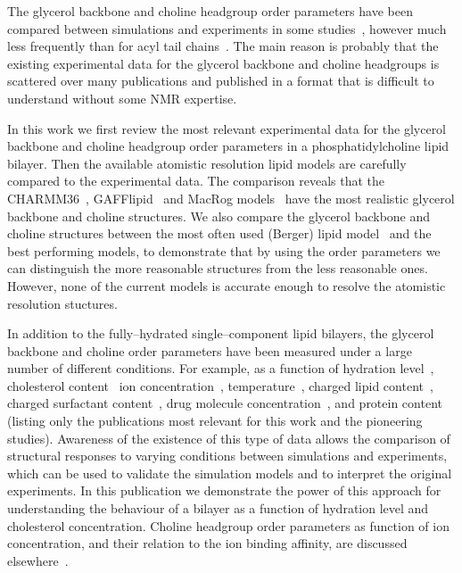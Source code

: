 \documentclass[pre,aps,floatfix,authordate1-4,twocolumn]{revtex4-1}
\begin{document}
The glycerol backbone and choline headgroup order parameters have been compared between simulations and experiments
in some studies~\cite{hogberg08,castro08,klauda10,kapla12,dickson12,poger12,ferreira13,chowdhary13,maciejewski14}, 
however much less frequently than for acyl tail chains~\cite{tieleman97,klauda08,edholm08,tieleman10,piggot12}.
The main reason is probably that the existing experimental data for the glycerol backbone
and choline headgroups is scattered over many publications and published in a format that is difficult to understand without some NMR expertise. 

In this work we first review the most relevant experimental data for the glycerol backbone and choline headgroup order parameters
in a phosphatidylcholine lipid bilayer. Then the available atomistic resolution lipid models are carefully compared to the 
experimental data. The comparison reveals that the CHARMM36~\cite{klauda10}, GAFFlipid~\cite{dickson12} and MacRog models~\cite{maciejewski14}
have the most realistic glycerol backbone and choline structures. We also compare the glycerol backbone and choline 
structures between the most often used (Berger) lipid model~\cite{berger97} and the best performing models, to demonstrate that by using the 
order parameters we can distinguish the more reasonable structures from the less reasonable ones. However, none of the current models 
is accurate enough to resolve the atomistic resolution stuctures.

In addition to the fully--hydrated single--component lipid bilayers, the glycerol backbone and choline order parameters
have been measured under a large number of different conditions. For example, as a function of hydration level~\cite{bechinger91,ulrich94,dvinskikh05b}, cholesterol content~\cite{brown78,ferreira13}
ion concentration~\cite{brown77,akutsu81,altenbach84,roux90,roux91}, temperature~\cite{gally75}, charged lipid content~\cite{roux90,roux91}, charged surfactant content~\cite{scherer89}, 
drug molecule concentration~\cite{kelusky84,castro08}, and protein content~\cite{roux89,kuchinka89} (listing only the publications most relevant for this work and the pioneering studies).
Awareness of the existence of this type of data allows the comparison of structural responses to varying conditions between simulations and experiments,
which can be used to validate the simulation models and to interpret the original experiments. 
In this publication we demonstrate the power of this approach for understanding the behaviour of a bilayer as a function of hydration level and cholesterol concentration.
Choline headgroup order parameters as function of ion concentration, and their relation to the ion binding affinity, are discussed elsewhere~\cite{ionpaper}.
\end{document}
